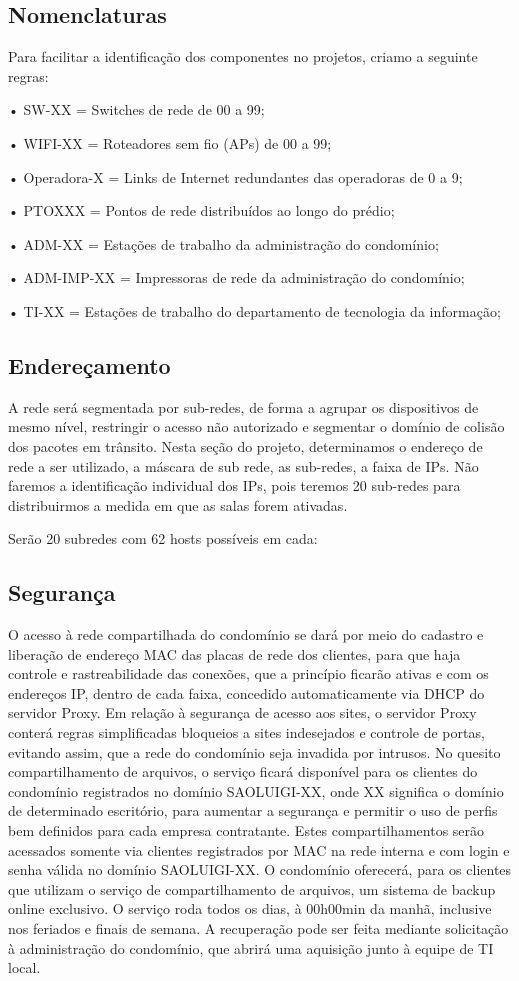 \documentclass[	DIV=calc,%
							paper=a4,%
							fontsize=12pt,%
							onecolumn]{scrartcl}	 					%
\begin{document}
\subsection{Nomenclaturas}
{\raggedright Para facilitar a identificação dos componentes no projetos, criamo a seguinte regras:

• SW-XX = Switches de rede de 00 a 99;

• WIFI-XX = Roteadores sem fio (APs) de 00 a 99;

• Operadora-X = Links de Internet redundantes das operadoras de 0 a 9;

• PTOXXX = Pontos de rede distribuídos ao longo do prédio;

• ADM-XX = Estações de trabalho da administração do condomínio;

• ADM-IMP-XX = Impressoras de rede da administração do condomínio;

• TI-XX = Estações de trabalho do departamento de tecnologia da informação;
}

\subsection{Endereçamento}
{\raggedright A rede será segmentada por sub-redes, de forma a agrupar os dispositivos de mesmo nível,
restringir o acesso não autorizado e segmentar o domínio de colisão dos pacotes em trânsito.
Nesta seção do projeto, determinamos o endereço de rede a ser utilizado, a máscara de sub rede,
as sub-redes, a faixa de IPs. Não faremos a identificação individual dos IPs, pois teremos 20
sub-redes para distribuirmos a medida em que as salas forem ativadas.
}
{\raggedright Serão 20 subredes com 62 hosts possíveis em cada:}


\subsection{Segurança}
{\raggedright  O acesso à rede compartilhada do condomínio se dará por meio do cadastro e liberação de
endereço MAC das placas de rede dos clientes, para que haja controle e rastreabilidade das
conexões, que a princípio ficarão ativas e com os endereços IP, dentro de cada faixa, concedido
automaticamente via DHCP do servidor Proxy.
Em relação à segurança de acesso aos sites, o servidor Proxy conterá regras simplificadas
bloqueios a sites indesejados e controle de portas, evitando assim, que a rede do condomínio seja
invadida por intrusos.
No quesito compartilhamento de arquivos, o serviço ficará disponível para os clientes do
condomínio registrados no domínio SAOLUIGI-XX, onde XX significa o domínio de determinado
escritório, para aumentar a segurança e permitir o uso de perfis bem definidos para cada empresa
contratante. Estes compartilhamentos serão acessados somente via clientes registrados por MAC
na rede interna e com login e senha válida no domínio SAOLUIGI-XX. O condomínio oferecerá, para os clientes que utilizam o serviço de compartilhamento de arquivos, um sistema de backup online exclusivo. O serviço roda todos os dias, à 00h00min da manhã, inclusive nos feriados e finais de semana. A recuperação pode ser feita mediante solicitação à administração do condomínio, que abrirá uma aquisição junto à equipe de TI local.
}
\end{document}

